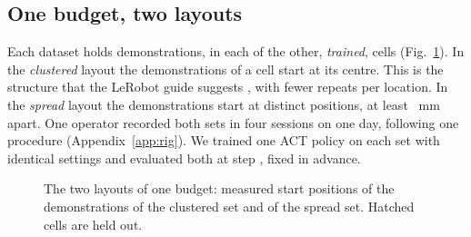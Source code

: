 \subsection{One budget, two layouts}
Each dataset holds \nDemos demonstrations, \nDemosPerCell in each of the \nCellsTrained other, \emph{trained}, cells (Fig.~\ref{fig:layouts}).
In the \emph{clustered} layout the \nDemosPerCell demonstrations of a cell start at its centre. This is the structure that the LeRobot guide suggests \cite{huggingface2026imitation}, with fewer repeats per location. %
In the \emph{spread} layout the demonstrations start at \nPointsSpread distinct positions, at least \spreadMinSpacing~mm apart.
One operator recorded both sets in four sessions on one day, following one procedure (Appendix~\ref{app:rig}). %
We trained one ACT policy \cite{zhao2023learning} on each set with identical settings and evaluated both at step \evalCheckpoint, fixed in advance. %

\begin{figure}[t]
\centering
{}
\caption{The two layouts of one budget: measured start positions of the \nDemos demonstrations of the clustered set and of the spread set. Hatched cells are held out.}
\label{fig:layouts}
\end{figure}

